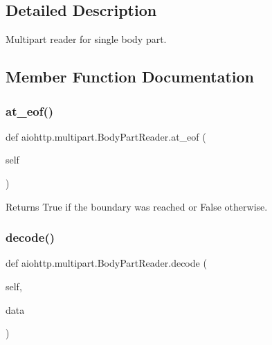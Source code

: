 \subsection{Detailed Description}
\begin{DoxyVerb}Multipart reader for single body part.\end{DoxyVerb}
 

\subsection{Member Function Documentation}
\mbox{\label{classaiohttp_1_1multipart_1_1_body_part_reader_a96ff9ae3bebde19124b072ec74ba8b34}} 
\subsubsection{\texorpdfstring{at\+\_\+eof()}{at\_eof()}}
{\footnotesize\ttfamily def aiohttp.\+multipart.\+Body\+Part\+Reader.\+at\+\_\+eof (\begin{DoxyParamCaption}\item[{}]{self }\end{DoxyParamCaption})}

\begin{DoxyVerb}Returns True if the boundary was reached or False otherwise.\end{DoxyVerb}
 \mbox{\label{classaiohttp_1_1multipart_1_1_body_part_reader_a97f00c080c7c84423636e182e7638706}} 
\subsubsection{\texorpdfstring{decode()}{decode()}}
{\footnotesize\ttfamily def aiohttp.\+multipart.\+Body\+Part\+Reader.\+decode (\begin{DoxyParamCaption}\item[{}]{self,  }\item[{}]{data }\end{DoxyParamCaption})}

